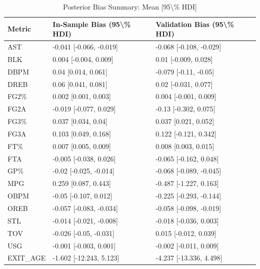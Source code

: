 \begin{table}[t]
\caption*{
{\fontsize{20}{25}\selectfont  Posterior Bias Summary: Mean [95\textbackslash{}\% HDI]\fontsize{12}{15}\selectfont }
} 
\fontsize{12.0pt}{14.0pt}\selectfont
\begin{tabular*}{\linewidth}{@{\extracolsep{\fill}}lll}
\toprule
Metric & In-Sample Bias (95\textbackslash{}\% HDI) & Validation Bias (95\textbackslash{}\% HDI) \\ 
\midrule\addlinespace[2.5pt]
AST & -0.041 [-0.066, -0.019] & -0.068 [-0.108, -0.029] \\ 
BLK & 0.004 [-0.004, 0.009] & 0.01 [-0.009, 0.028] \\ 
DBPM & 0.04 [0.014, 0.061] & -0.079 [-0.11, -0.05] \\ 
DREB & 0.06 [0.041, 0.081] & 0.02 [-0.031, 0.077] \\ 
FG2\% & 0.002 [0.001, 0.003] & 0.004 [-0.001, 0.009] \\ 
FG2A & -0.019 [-0.077, 0.029] & -0.13 [-0.302, 0.075] \\ 
FG3\% & 0.037 [0.034, 0.04] & 0.037 [0.021, 0.052] \\ 
FG3A & 0.103 [0.049, 0.168] & 0.122 [-0.121, 0.342] \\ 
FT\% & 0.007 [0.005, 0.009] & 0.008 [0.003, 0.015] \\ 
FTA & -0.005 [-0.038, 0.026] & -0.065 [-0.162, 0.048] \\ 
GP\% & -0.02 [-0.025, -0.014] & -0.068 [-0.089, -0.045] \\ 
MPG & 0.259 [0.087, 0.443] & -0.487 [-1.227, 0.163] \\ 
OBPM & -0.05 [-0.107, 0.012] & -0.225 [-0.293, -0.144] \\ 
OREB & -0.057 [-0.083, -0.034] & -0.058 [-0.098, -0.019] \\ 
STL & -0.014 [-0.021, -0.008] & -0.018 [-0.036, 0.003] \\ 
TOV & -0.026 [-0.05, -0.031] & 0.015 [-0.012, 0.039] \\ 
USG & -0.001 [-0.003, 0.001] & -0.002 [-0.011, 0.009] \\ 
EXIT\_AGE & -1.602 [-12.243, 5.123] & -4.237 [-13.336, 4.498] \\ 
\bottomrule
\end{tabular*}
\end{table}

